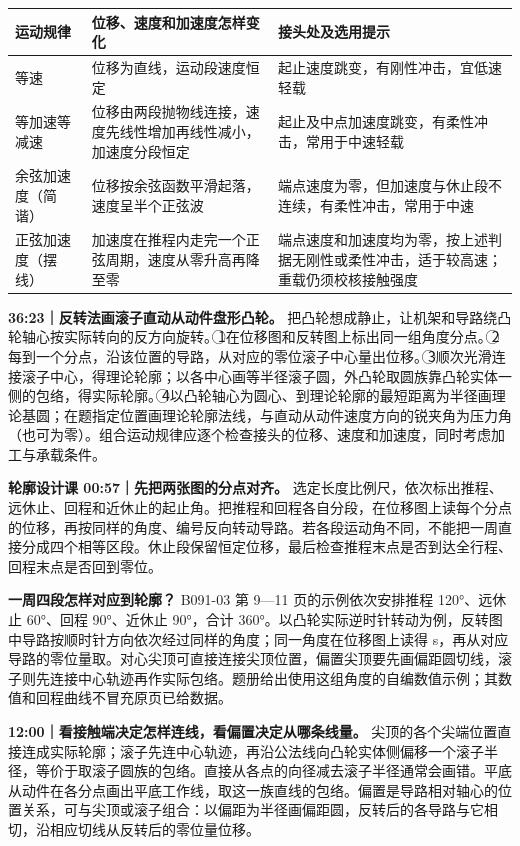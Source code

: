 \documentclass[zihao=5,a4paper,UTF8,fontset=fandol]{ctexart}
\begin{document}
\begin{longtable}{p{4.86cm}p{4.86cm}p{4.86cm}}
\toprule
运动规律 & 位移、速度和加速度怎样变化 & 接头处及选用提示 \\

\midrule
\endhead
等速 & 位移为直线，运动段速度恒定 & 起止速度跳变，有刚性冲击，宜低速轻载 \\
等加速等减速 & 位移由两段抛物线连接，速度先线性增加再线性减小，加速度分段恒定 & 起止及中点加速度跳变，有柔性冲击，常用于中速轻载 \\
余弦加速度（简谐） & 位移按余弦函数平滑起落，速度呈半个正弦波 & 端点速度为零，但加速度与休止段不连续，有柔性冲击，常用于中速 \\
正弦加速度（摆线） & 加速度在推程内走完一个正弦周期，速度从零升高再降至零 & 端点速度和加速度均为零，按上述判据无刚性或柔性冲击，适于较高速；重载仍须校核接触强度 \\
\bottomrule
\end{longtable}

\textbf{36:23｜反转法画滚子直动从动件盘形凸轮。} 把凸轮想成静止，让机架和导路绕凸轮轴心按实际转向的反方向旋转。\textcircled{1}在位移图和反转图上标出同一组角度分点。\textcircled{2}每到一个分点，沿该位置的导路，从对应的零位滚子中心量出位移。\textcircled{3}顺次光滑连接滚子中心，得理论轮廓；以各中心画等半径滚子圆，外凸轮取圆族靠凸轮实体一侧的包络，得实际轮廓。\textcircled{4}以凸轮轴心为圆心、到理论轮廓的最短距离为半径画理论基圆；在题指定位置画理论轮廓法线，与直动从动件速度方向的锐夹角为压力角（也可为零）。组合运动规律应逐个检查接头的位移、速度和加速度，同时考虑加工与承载条件。


\textbf{轮廓设计课 00:57｜先把两张图的分点对齐。} 选定长度比例尺，依次标出推程、远休止、回程和近休止的起止角。把推程和回程各自分段，在位移图上读每个分点的位移，再按同样的角度、编号反向转动导路。若各段运动角不同，不能把一周直接分成四个相等区段。休止段保留恒定位移，最后检查推程末点是否到达全行程、回程末点是否回到零位。


\textbf{一周四段怎样对应到轮廓？} B091-03 第 9—11 页的示例依次安排推程 120°、远休止 60°、回程 90°、近休止 90°，合计 360°。以凸轮实际逆时针转动为例，反转图中导路按顺时针方向依次经过同样的角度；同一角度在位移图上读得 s，再从对应导路的零位量取。对心尖顶可直接连接尖顶位置，偏置尖顶要先画偏距圆切线，滚子则先连接中心轨迹再作实际包络。题册给出使用这组角度的自编数值示例；其数值和回程曲线不冒充原页已给数据。


\textbf{12:00｜看接触端决定怎样连线，看偏置决定从哪条线量。} 尖顶的各个尖端位置直接连成实际轮廓；滚子先连中心轨迹，再沿公法线向凸轮实体侧偏移一个滚子半径，等价于取滚子圆族的包络。直接从各点的向径减去滚子半径通常会画错。平底从动件在各分点画出平底工作线，取这一族直线的包络。偏置是导路相对轴心的位置关系，可与尖顶或滚子组合：以偏距为半径画偏距圆，反转后的各导路与它相切，沿相应切线从反转后的零位量位移。
\end{document}
